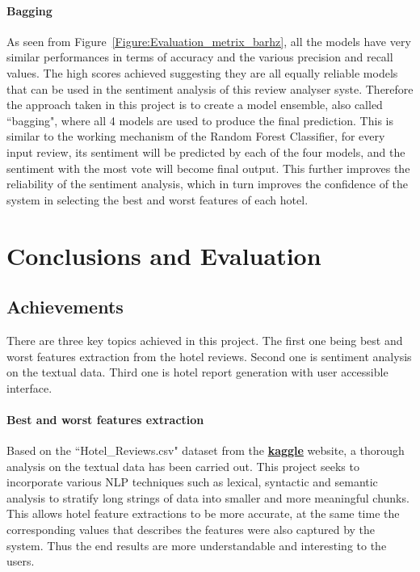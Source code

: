 \documentclass[a4paper]{report}
\begin{document}
{{\subsubsection{Bagging}
As seen from Figure~\ref{Figure:Evaluation_metrix_barhz}, all the models have very similar performances in terms of accuracy and the various precision and recall values. The high scores achieved suggesting they are all equally reliable models that can be used in the sentiment analysis of this review analyser syste. Therefore the approach taken in this project is to create a model ensemble, also called “bagging", where all 4 models are used to produce the final prediction. This is similar to the working mechanism of the Random Forest Classifier, for every input review, its sentiment will be predicted by each of the four models, and the sentiment with the most vote will become final output. This further improves the reliability of the sentiment analysis, which in turn improves the confidence of the system in selecting the best and worst features of each hotel.



\chapter{Conclusions and Evaluation}
\section{Achievements}
There are three key topics achieved in this project. The first one being best and worst features extraction from the hotel reviews. Second one is sentiment analysis on the textual data. Third one is hotel report generation with user accessible interface. 

\subsubsection{Best and worst features extraction}
Based on the “Hotel\_Reviews.csv" dataset from the \href{https://www.kaggle.com/jiashenliu/515k-hotel-reviews-data-in-europe}{\textbf{kaggle}} website, a thorough analysis on the textual data has been carried out. This project seeks to incorporate various NLP techniques such as lexical, syntactic and semantic analysis to stratify long strings of data into smaller and more meaningful chunks. This allows hotel feature extractions to be more accurate, at the same time the corresponding values that describes the features were also captured by the system. Thus the end results are more understandable and interesting to the users.

}}
\end{document}

